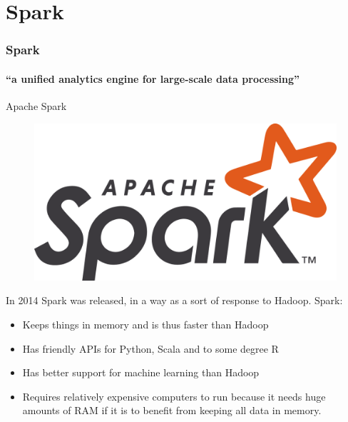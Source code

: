 \documentclass[aspectratio=169,usenames,dvipsnames]{beamer}
\begin{document}
\section{Spark}
    \begin{frame}
        \frametitle{Spark}
        \framesubtitle{``a unified analytics engine for large-scale data processing''}
        \begin{block}{Apache Spark}
        \begin{figure}
        \vspace{-1\baselineskip}
        \includegraphics[width=0.9\linewidth]{figures/Spark.png}\hfill
        \end{figure}
        In \alert{2014} Spark was released, in a way as a sort of response to Hadoop. Spark:
        \begin{itemize}
            \item Keeps things \alert{in memory} and is thus faster than Hadoop
        \end{itemize}\vspace{-4pt}

        \begin{itemize}
            \item Has \alert{friendly API}s for Python, Scala and to some degree R
            \item Has \alert{better support for machine learning} than Hadoop
            \item Requires \alert{relatively expensive computers} to run because it
            needs huge amounts of RAM if it is to benefit from keeping all data
            in memory.
        \end{itemize}
        \end{block}
    \end{frame}
\end{document}
